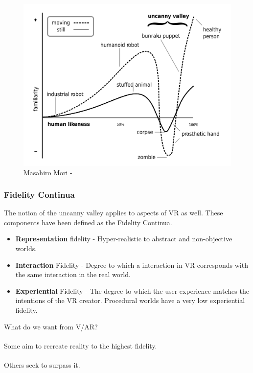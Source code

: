 \begin{frame}
	\begin{figure}
		 \includegraphics[scale=.13]{assets/uncanny}  
		  \caption{Masahiro Mori - }
	\end{figure}
\end{frame}

\begin{frame}
	\frametitle{Fidelity Continua}
	The notion of the uncanny valley applies to aspects of VR as well. These components have been defined as the Fidelity Continua. 
	
	\begin{itemize}
	 	\item	\textbf{Representation} fidelity - Hyper-realistic to abstract and non-objective worlds. 
		\item	\textbf{Interaction} Fidelity - Degree to which a interaction in VR corresponds with the same interaction in the real world.
		\item \textbf{Experiential} Fidelity - The degree to which the user experience matches the intentions of the VR creator. Procedural worlds have a very low experiential fidelity.
	 \end{itemize}
		
\end{frame}

\begin{frame}
	What do we want from V/AR? \\~\\
	Some aim to recreate reality to the highest fidelity. \\~\\
	Others seek to surpass it.
\end{frame}



